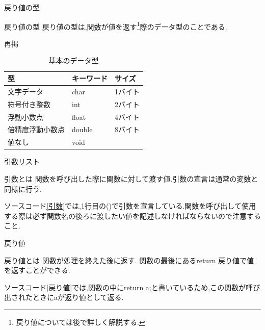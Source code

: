 \begin{frame}{戻り値の型}
    \begin{block}{戻り値の型}
        戻り値の型は,関数が値を返す\footnote{戻り値については後で詳しく解説する.}際のデータ型のことである.
    \end{block}
    \begin{exampleblock}{再掲}
        \begin{table}[]
            \centering
            \begin{tabular}{|l|l|l|}
                \hline
                型       & キーワード  & サイズ\\
                \hline
                文字データ & char  & 1バイト\\
                符号付き整数 & int  & 2バイト\\
                浮動小数点 & float & 4バイト\\
                倍精度浮動小数点 & double & 8バイト\\
                値なし & void & \\
                \hline
            \end{tabular}
            \caption{基本のデータ型}
            \label{tab:my_label}
        \end{table}        
    \end{exampleblock}
\end{frame}

\begin{frame}[fragile]{引数リスト}
    \begin{block}{引数とは}
        関数を呼び出した際に関数に対して渡す値.引数の宣言は通常の変数と同様に行う.
    \end{block}
    
    ソースコード\ref{引数}では,1行目の()で引数を宣言している.関数を呼び出して使用する際は必ず関数名の後ろに渡したい値を記述しなければならないので注意すること.
\end{frame}

\begin{frame}[fragile]{戻り値}
\begin{block}{戻り値とは}
    関数が処理を終えた後に返す.
    関数の最後にあるreturn 戻り値で値を返すことができる.
\end{block}
    
    ソースコード\ref{戻り値}では,関数の中にreturn a;と書いているため,この関数が呼び出されたときにaが返り値として返る.
\end{frame}

